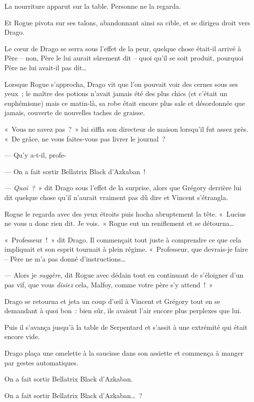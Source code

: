 La nourriture apparut sur la table. Personne ne la regarda.

Et Rogue pivota sur ses talons, abandonnant ainsi sa cible, et se dirigea droit vers Drago.

Le cœur de Drago se serra sous l'effet de la peur, quelque chose était-il arrivé à Père -- non, Père le lui aurait sûrement dit -- quoi qu'il se soit produit, pourquoi Père ne lui avait-il pas dit…

Lorsque Rogue s'approcha, Drago vit que l'on pouvait voir des cernes sous ses yeux~; le maître des potions n'avait jamais été des plus chics (et c'était un euphémisme) mais ce matin-là, sa robe était encore plus sale et désordonnée que jamais, couverte de nouvelles taches de graisse.

«~Vous ne savez pas~?~» lui siffla son directeur de maison lorsqu'il fut assez près. «~De grâce, ne vous faites-vous pas livrer le journal~?

--- Qu'y a-t-il, profe-

--- On a fait sortir Bellatrix Black d'Azkaban~!

--- \emph{Quoi~?}~» dit Drago sous l'effet de la surprise, alors que Grégory derrière lui dit quelque chose qu'il n'aurait vraiment pas dû dire et Vincent s'étrangla.

Rogue le regarda avec des yeux étroits puis hocha abruptement la tête. «~Lucius ne vous a donc rien dit. Je vois.~» Rogue eut un reniflement et se détourna…

«~Professeur~!~» dit Drago. Il commençait tout juste à comprendre ce que cela impliquait et son esprit tournait à plein régime. «~Professeur, que devrais-je faire -- Père ne m'a pas donné d'instructions…

--- Alors je \emph{suggère}, dit Rogue avec dédain tout en continuant de s'éloigner d'un pas vif, que vous \emph{disiez} cela, Malfoy, comme votre père s'y attend~!~»

Drago se retourna et jeta un coup d'œil à Vincent et Grégory tout en se demandant à quoi bon~: bien sûr, ils avaient l'air encore plus perplexes que lui.

Puis il s'avança jusqu'à la table de Serpentard et s'assit à une extrémité qui était encore vide.

Drago plaça une omelette à la saucisse dans son assiette et commença à manger par gestes automatiques.

On a fait sortir Bellatrix Black d'Azkaban.

On a fait sortir Bellatrix Black d'Azkaban…~?


